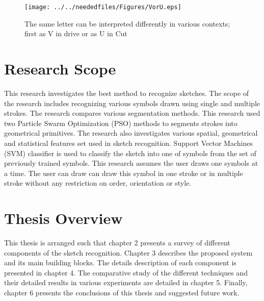 \begin{figure}	
	\centering
		\texttt{[image: ../../neededfiles/Figures/VorU.eps]}
	\caption[Ambiguities Handwriting] { The same letter can be interpreted differently in various contexts; first as V in drive or as U in Cut}
\label{fig:VorU}
\end{figure} 	

\section{Research Scope}
 This research investigates the best method to recognize sketches. The scope of the research includes recognizing various symbols drawn using single and multiple strokes. The research compares various segmentation methods.  This research used two Particle Swarm Optimization (PSO) \cite{PSOFirst} methods to segments strokes into geometrical primitives.  The research also investigates various spatial, geometrical and statistical features set used in sketch recognition.  Support Vector Machines (SVM) classifier\cite{svmintroduce} is used to classify  the sketch  into one of symbols from the set of previously trained symbols.  
This research assumes the user draws one symbols at a time. The user can draw can draw this symbol in one stroke or in multiple stroke without any restriction on order, orientation or style. 
 
 
\section{Thesis Overview}
This thesis is arranged such that chapter 2 presents a survey of different components of the sketch recognition. Chapter 3 describes the proposed system and its main building blocks. The details description of each component is presented in chapter 4. The comparative study of the different techniques and their detailed results in various experiments are detailed in chapter 5. Finally, chapter 6 presents the conclusions of this thesis and suggested future work.
